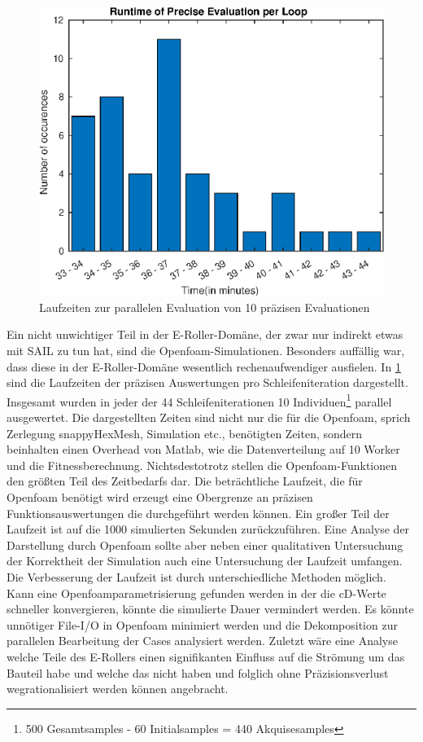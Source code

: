 \begin{figure}[h]
	\centering
	\includegraphics[width=.7\linewidth]{bilder/escooter/peRuntime}
	\caption{Laufzeiten zur parallelen Evaluation von 10 präzisen Evaluationen}
	\label{fig:escooterpeRuntime}
\end{figure}

Ein nicht unwichtiger Teil in der E-Roller-Domäne, der zwar nur indirekt etwas mit SAIL zu tun hat, sind die Openfoam-Simulationen.
Besonders auffällig war, dass diese in der E-Roller-Domäne wesentlich rechenaufwendiger ausfielen.
In \cref{fig:escooterpeRuntime} sind die Laufzeiten der präzisen Auswertungen pro Schleifeniteration dargestellt.
Insgesamt wurden in jeder der 44 Schleifeniterationen 10 Individuen\footnote{500 Gesamtsamples - 60 Initialsamples = 440 Akquisesamples} parallel ausgewertet.
Die dargestellten Zeiten sind nicht nur die für die Openfoam, sprich Zerlegung snappyHexMesh, Simulation etc., benötigten Zeiten, sondern beinhalten einen Overhead von Matlab, wie die Datenverteilung auf 10 Worker und die Fitnessberechnung.
Nichtsdestotrotz stellen die Openfoam-Funktionen den größten Teil des Zeitbedarfs dar.
Die beträchtliche Laufzeit, die für Openfoam benötigt wird erzeugt eine Obergrenze an präzisen Funktionsauswertungen die durchgeführt werden können.
Ein großer Teil der Laufzeit ist auf die 1000 simulierten Sekunden zurückzuführen.
Eine Analyse der Darstellung durch Openfoam sollte aber neben einer qualitativen Untersuchung der Korrektheit der Simulation auch eine Untersuchung der Laufzeit umfangen.
Die Verbesserung der Laufzeit ist durch unterschiedliche Methoden möglich.
Kann eine Openfoamparametrisierung gefunden werden in der die cD-Werte schneller konvergieren, könnte die simulierte Dauer vermindert werden.
Es könnte unnötiger File-I/O in Openfoam minimiert werden und die Dekomposition zur parallelen Bearbeitung der Cases analysiert werden.
Zuletzt wäre eine Analyse welche Teile des E-Rollers einen signifikanten Einfluss auf die Strömung um das Bauteil habe und welche das nicht haben und folglich ohne Präzisionsverlust wegrationalisiert werden können angebracht.


